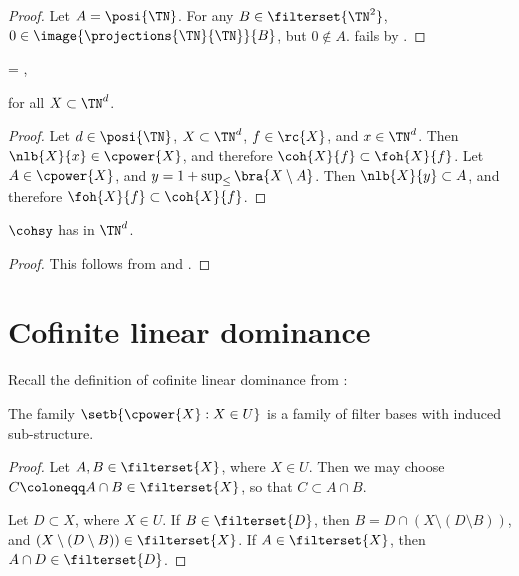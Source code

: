 \documentclass[b5paper, english, oneside]{memoir}
\begin{document}
\begin{proof}
Let $A = \posi{\TN}$. For any $B \in \filterset{\TN^2}$, $0 \in \image{\projections{\TN}{\TN}}{B}$, but $0 \not\in A$.  fails by .
\end{proof}

\begin{theorem}
\label{CoasymptoticIsEquivalentToCofiniteInN}
\begin{eqs}
 = ,
\end{eqs}
for all $X \subset \TN^d$.
\end{theorem}

\begin{proof}
Let $d \in \posi{\TN}$, $X \subset \TN^d$, $f \in \rc{X}$, and $x \in \TN^d$. Then $\nlb{X}{x} \in \cpower{X}$, and therefore $\coh{X}{f} \subset \foh{X}{f}$. Let $A \in \cpower{X}$, and $y = 1 + \sup_{\leq} \bra{X \setminus A}$. Then $\nlb{X}{y} \subset A$, and therefore $\foh{X}{f} \subset \coh{X}{f}$.
\end{proof}

\begin{theorem}
\label{CoasymptoticInjectiveComposability}
$\cohsy$ has  in $\TN^d$.
\end{theorem}

\begin{proof}
This follows from  and .
\end{proof}

\section{Cofinite linear dominance}
\label{CofiniteLinearDominance}

Recall the definition of cofinite linear dominance from :

\begin{theorem}
\label{CofiniteLinearDominanceIsLocalLinearDominance}
The family $\setb{\cpower{X} : X \in U}$ is a family of filter bases with induced sub-structure.
\end{theorem}

\begin{proof}
Let $A, B \in \filterset{X}$, where $X \in U$. Then we may choose $C \coloneqq A \cap B \in \filterset{X}$, so that $C \subset A \cap B$. 

Let $D \subset X$, where $X \in U$. If $B \in \filterset{D}$, then $B = D \cap (X \setminus (D \setminus B))$, and $(X \setminus (D \setminus B)) \in \filterset{X}$. If $A \in \filterset{X}$, then $A \cap D \in \filterset{D}$. 
\end{proof}
\end{document}
